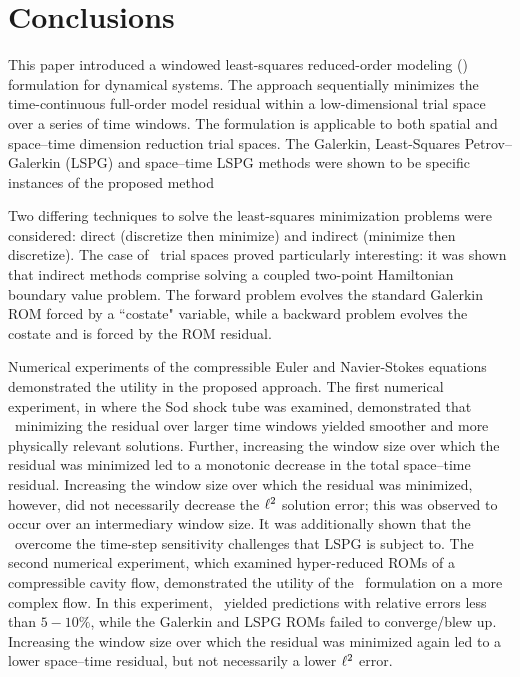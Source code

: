 \documentclass[3p,computermodern,10pt]{elsarticle}
\begin{document}
%
%






\section{Conclusions}\label{sec:conclude}
This paper introduced a windowed least-squares reduced-order modeling (\methodAcronym) formulation for dynamical systems. The approach sequentially minimizes the time-continuous full-order model residual within a low-dimensional trial space over a series of time windows. The formulation is applicable to both spatial and space--time dimension reduction trial spaces. The Galerkin, Least-Squares Petrov--Galerkin (LSPG) and space--time LSPG methods were shown to be specific instances of the proposed method 


Two differing techniques to solve the least-squares minimization problems were considered: direct (discretize then minimize) and indirect (minimize then discretize). 
The case of \spatialAcronym\ trial spaces proved particularly interesting: it was shown that indirect methods comprise solving a coupled two-point 
Hamiltonian boundary value problem. The forward problem evolves the standard Galerkin ROM forced by a ``costate" variable, while a backward problem evolves the costate and is forced by the ROM residual.

Numerical experiments of the compressible Euler and Navier-Stokes equations demonstrated the utility in the proposed approach. The first numerical experiment, in where the Sod shock tube was examined, demonstrated that \methodAcronymROMs\ minimizing the residual over larger time windows yielded smoother and more physically relevant solutions. Further, increasing the window size over which the residual was minimized led to a monotonic decrease in the total space--time residual. Increasing the window size over which the residual was minimized, however, did not necessarily decrease the $\ell^2$ solution error; this was observed to occur over an intermediary window size. It was 
additionally shown that the \methodAcronymROMs\ overcome the time-step sensitivity challenges that LSPG is subject to. The second numerical experiment, which examined hyper-reduced ROMs of a compressible cavity flow, demonstrated the utility of the \methodAcronym\ formulation on a more complex flow. In this experiment, \methodAcronymROMs\ yielded predictions with relative errors less than $5-10\%$, while the Galerkin and LSPG ROMs failed to converge/blew up. Increasing the window size over which the residual was minimized again led to a lower space--time residual, but not necessarily a lower $\ell^2$ error.
\end{document}
